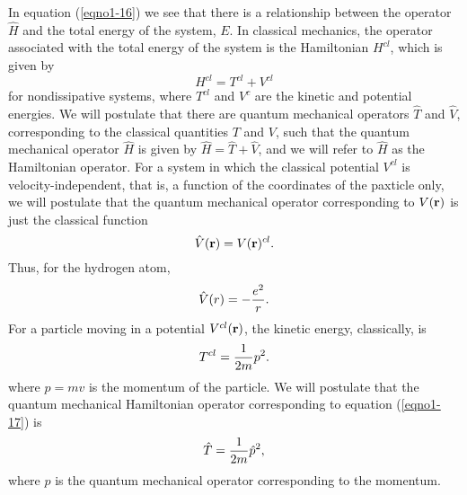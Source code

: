 In equation (\ref{eqno1-16}) we see that there is a relationship
between the operator ${\hat H}$ and the total energy of the system,
$E$. In classical mechanics, the operator associated with the total
energy of the system is the Hamiltonian $H^{cl}$, which is given by
\begin{equation}
H^{cl} = T^{cl} + V^{cl}
\label{h_cl}
\end{equation}
for nondissipative systems, where $T^{cl}$ and $V^c$ are the kinetic
and potential energies. We will postulate that there are quantum
mechanical operators ${\hat T}$ and ${\hat V}$, corresponding to the
classical quantities $T$ and $V$, such that the quantum mechanical
operator ${\hat H}$ is given by ${\hat H} = {\hat T} + {\hat V}$, and
we will refer to ${\hat H}$ as the Hamiltonian operator.  For a system
in which the classical potential $V^{cl}$ is velocity-independent,
that is, a function of the coordinates of the paxticle only, we will
postulate that the quantum mechanical operator corresponding to $V (
{\bf r} )$ is just the classical function
\begin{equation}
{\hat V} ( {\bf r} ) = V ( {\bf r} )^{cl}.
\label{eqno1-17}
\end{equation}
Thus, for the hydrogen atom,
\begin{equation}
{\hat V} (r) = - {e^2 \over r} .
\end{equation}
For a particle moving in a potential $V^{cl}({\bf r})$, the kinetic
energy, classically, is
\begin{equation}
T^{cl} = {1 \over 2m} p^2 .
\label{eqno1-18}
\end{equation}
where $p = mv$ is the momentum of the particle.  We will postulate
that the quantum mechanical Hamiltonian operator corresponding to
equation (\ref{eqno1-17}) is
\begin{equation}
{\hat T} = {1 \over 2m} {\hat p}^2 ,
\end{equation}
where ${\hat p}$ is the quantum mechanical operator corresponding to the 
momentum.

